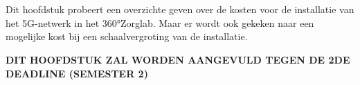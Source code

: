 \chapter{}%
\label{ch:financieel}


Dit hoofdstuk probeert een overzichte geven over de kosten voor de installatie van het 5G-netwerk in het 360°Zorglab. Maar er wordt ook gekeken naar een mogelijke kost bij een schaalvergroting van de installatie.

\textbf{DIT HOOFDSTUK ZAL WORDEN AANGEVULD TEGEN DE 2DE DEADLINE (SEMESTER 2)}